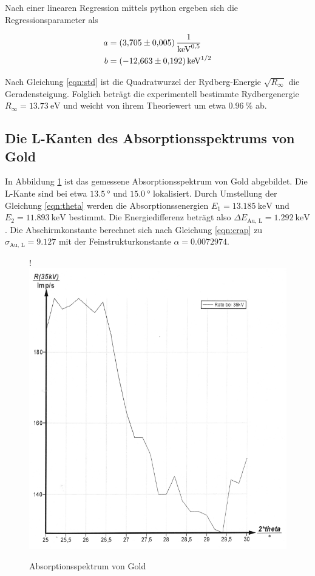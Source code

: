 Nach einer linearen Regression mittels python ergeben sich die
Regressionsparameter als

\begin{align*}
  a &= \SI{3.705 +- 0.005}{\per \kilo \eV \tothe{1/2}} \\
  b &= \SI{-12.663 +- 0.192}{\kilo \eV \tothe{1/2}}
\end{align*}

Nach Gleichung \eqref{eqn:std} ist die Quadratwurzel der Rydberg-Energie
$\sqrt{R_\infty}$ die Geradensteigung. Folglich beträgt die experimentell
bestimmte Rydbergenergie $R_\infty = \SI{13.73}{\eV}$ und weicht von ihrem
Theoriewert um etwa $\SI{0.96}{\percent}$ ab.

\subsection{Die L-Kanten des Absorptionsspektrums von Gold}

In Abbildung \ref{fig:plot7} ist das gemessene Absorptionsspektrum von Gold abgebildet.
Die L-Kante sind bei etwa $\SI{13.5}{\degree}$ und $\SI{15.0}{\degree}$ lokalisiert.
Durch Umstellung der Gleichung \eqref{eqn:theta} werden die Absorptionssenergien 
$ E_1 = \SI{13.185}{\kilo\eV}$ und $ E_2 = \SI{11.893}{\kilo\eV}$ bestimmt.
Die Energiedifferenz beträgt also $\Delta E_\text{Au, L} = \SI{1.292}{\kilo\eV}$.
Die Abschirmkonstante berechnet sich nach Gleichung \eqref{eqn:crap} zu 
$\sigma_\text{Au, L} = 9.127$ mit der Feinstrukturkonstante
$\alpha = 0.0072974$.

\begin{figure}[H]!
  \centering
  \includegraphics[scale=0.3]{content/bild3.png}
  \caption{Absorptionsspektrum von Gold}
  \label{fig:plot7}
\end{figure}







